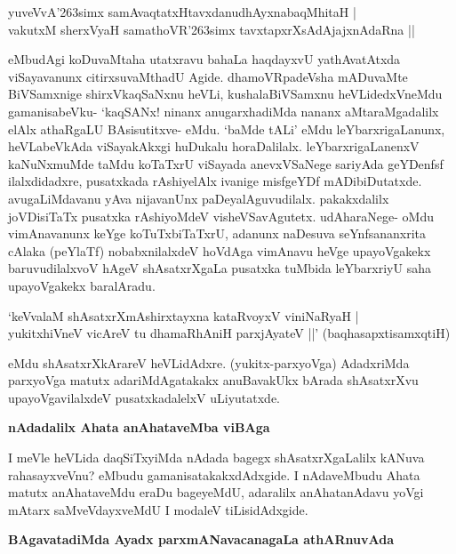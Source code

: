 \begin{shloka}
yuveVvA\char'263simx samAvaqtatxHtavxdanudhAyxnabaqMhitaH |\\
vakutxM sherxVyaH samathoVR\char'263simx tavxtapxrXsAdAjajxnAdaRna ||
\end{shloka}

eMbudAgi koDuvaMtaha utatxravu bahaLa haqdayxvU yathAvatAtxda viSayavanunx citirxsuvaMthadU Agide. dhamoVRpadeVsha mADuvaMte BiVSamxnige shirxVkaqSaNxnu heVLi, kushalaBiVSamxnu heVLidedxVneMdu gamanisabeVku- `kaqSANx! ninanx anugarxhadiMda nananx aMtaraMgadalilx elAlx athaRgaLU BAsisutitxve- eMdu. `baMde tALi' eMdu leYbarxrigaLanunx, heVLabeVkAda viSayakAkxgi huDukalu horaDalilalx. leYbarxrigaLanenxV kaNuNxmuMde taMdu koTaTxrU viSayada anevxVSaNege sariyAda geYDenfsf ilalxdidadxre, pusatxkada rAshiyelAlx ivanige misfgeYDf mADibiDutatxde. avugaLiMdavanu yAva nijavanUnx paDeyalAguvudilalx. pakakxdalilx joVDisiTaTx pusatxka rAshiyoMdeV visheVSavAgutetx. udAharaNege- oMdu vimAnavanunx keYge koTuTxbiTaTxrU, adanunx naDesuva seYnfsananxrita cAlaka (peYlaTf) nobabxnilalxdeV hoVdAga vimAnavu heVge upayoVgakekx baruvudilalxvoV hAgeV shAsatxrXgaLa pusatxka tuMbida leYbarxriyU saha upayoVgakekx baralAradu.

\begin{shloka}
`keVvalaM shAsatxrXmAshirxtayxna kataRvoyxV viniNaRyaH |\\
yukitxhiVneV vicAreV tu dhamaRhAniH parxjAyateV ||' \quad(baqhasapxtisamxqtiH)
\end{shloka}

eMdu shAsatxrXkArareV heVLidAdxre. (yukitx-parxyoVga) AdadxriMda parxyoVga matutx adariMdAgatakakx anuBavakUkx bArada shAsatxrXvu upayoVgavilalxdeV pusatxkadalelxV uLiyutatxde.

{\bf nAdadalilx Ahata anAhataveMba viBAga}

I meVle heVLida daqSiTxyiMda nAdada bagegx shAsatxrXgaLalilx kANuva rahasayxveVnu? eMbudu gamanisatakakxdAdxgide. I nAdaveMbudu Ahata matutx anAhataveMdu eraDu bageyeMdU, adaralilx anAhatanAdavu yoVgi mAtarx saMveVdayxveMdU I modaleV tiLisidAdxgide.

{\bf BAgavatadiMda Ayadx parxmANavacanagaLa athARnuvAda}

